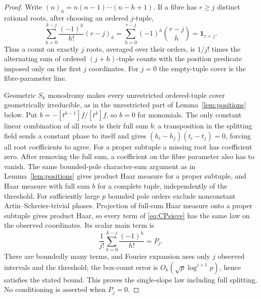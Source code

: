 \begin{proof}
Write $(n)_h=n(n-1)\cdots(n-h+1)$.  If a fibre has $r\ge j$ distinct rational roots, after choosing an ordered $j$-tuple,
\begin{equation}\label{eq:CPsieve}
 \sum_{h=0}^{k-j}\frac{(-1)^h}{h!}(r-j)_h
 =\sum_{h=0}^{r-j}(-1)^h\binom{r-j}{h}=\mathbf1_{r=j}.
\end{equation}
Thus a count on exactly $j$ roots, averaged over their orders, is $1/j!$ times the alternating sum of
ordered $(j+h)$-tuple counts with the position predicate imposed only on the first $j$ coordinates.
For $j=0$ the empty-tuple cover is the fibre-parameter line.

Geometric $S_k$ monodromy makes every unrestricted ordered-tuple cover geometrically irreducible, as in the
unrestricted part of Lemma~\ref{lem:positions} below.  Put $b=-[t^{k-1}]f/[t^k]f$, so $b=0$ for monomials.
The only constant linear combination of all roots is their full sum $b$:
a transposition in the splitting field sends a constant phase to itself and gives
$(h_i-h_j)(t_i-t_j)=0$, forcing all root coefficients to agree.  For a proper subtuple a missing root has coefficient zero.
After removing the full sum, a coefficient on the fibre parameter also has to vanish.
The same bounded-pole character-sum argument as in Lemma~\ref{lem:positions} gives product Haar measure for a proper subtuple,
and Haar measure with full sum $b$ for a complete tuple, independently of the threshold.
For sufficiently large $p$ bounded pole orders exclude nonconstant Artin--Schreier-trivial phases.
Projection of full-sum Haar measure onto a proper subtuple gives product Haar, so every term of \eqref{eq:CPsieve}
has the same law on the observed coordinates.  Its scalar main term is
\[
 \frac1{j!}\sum_{h=0}^{k-j}\frac{(-1)^h}{h!}=P_j.
\]
There are boundedly many terms, and Fourier expansion uses only $j$ observed intervals and the threshold;
the box-count error is $O_k(\sqrt p\log^{j+1}p)$, hence satisfies the stated bound.
This proves the single-slope law including full splitting.  No conditioning is asserted when $P_j=0$.


\end{proof}
